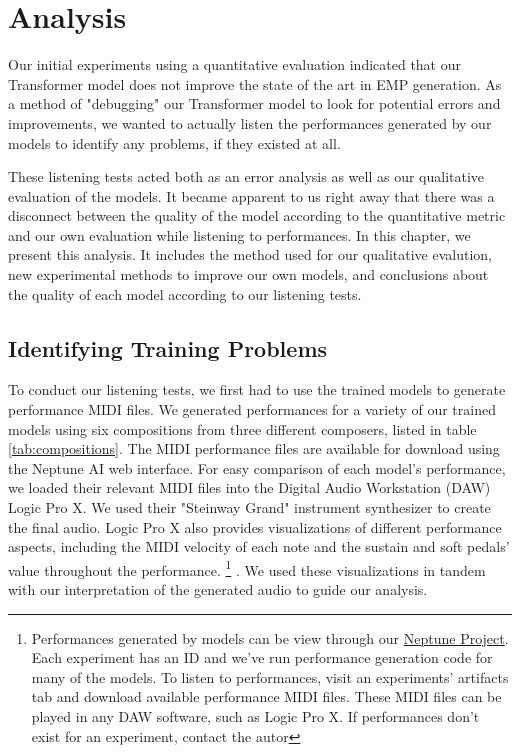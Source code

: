 \chapter{Analysis} \label{ch:ch6}
Our initial experiments using a quantitative evaluation indicated that our Transformer model does not improve the state of the art in EMP generation. As a method of "debugging" our Transformer model to look for potential errors and improvements, we wanted to actually listen the performances generated by our models to identify any problems, if they existed at all. 

These listening tests acted both as an error analysis as well as our qualitative evaluation of the models. It became apparent to us right away that there was a disconnect between the quality of the model according to the quantitative metric and our own evaluation while listening to performances. In this chapter, we present this analysis. It includes the method used for our qualitative evalution, new experimental methods to improve our own models, and conclusions about the quality of each model according to our listening tests. 



\section{Identifying Training Problems}\label{sec:qualitative-eval-problems}
To conduct our listening tests, we first had to use the trained models to generate performance MIDI files. We generated performances for a variety of our trained models using six compositions from three different composers, listed in table \ref{tab:compositions}. The MIDI performance files are available for download using the Neptune AI web interface. For easy comparison of each model's performance, we loaded their relevant MIDI files into the Digital Audio Workstation (DAW) Logic Pro X. We used their "Steinway Grand" instrument synthesizer to create the final audio. Logic Pro X also provides visualizations of different performance aspects, including the MIDI velocity of each note and the sustain and soft pedals' value throughout the performance. \footnote{Performances generated by models can be view through our \href{https://ui.neptune.ai/richt3211/thesis/experiments}{Neptune Project}. Each experiment has an ID and we've run performance generation code for many of the models. To listen to performances, visit an experiments' artifacts tab and download available performance MIDI files. These MIDI files can be played in any DAW software, such as Logic Pro X. If performances don't exist for an experiment, contact the autor} . We used these visualizations in tandem with our interpretation of the generated audio to guide our analysis. 

